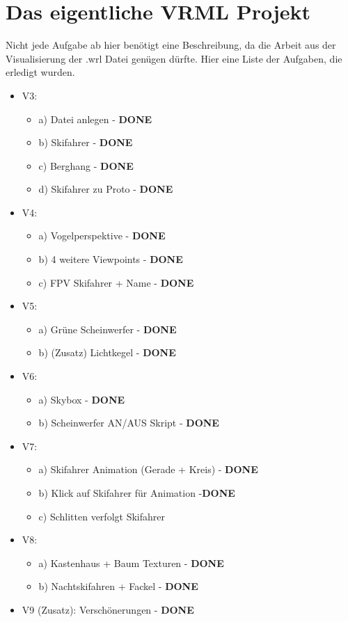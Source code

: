 \documentclass{article}
\begin{document}
\newpage

\section*{Das eigentliche VRML Projekt}
Nicht jede Aufgabe ab hier benötigt eine Beschreibung, da die Arbeit aus der Visualisierung der .wrl
Datei genügen dürfte. Hier eine Liste der Aufgaben, die erledigt wurden.

\begin{itemize}
    \item V3:
    \begin{itemize}
        \item a) Datei anlegen - \textbf{DONE}
        \item b) Skifahrer - \textbf{DONE}
        \item c) Berghang - \textbf{DONE}
        \item d) Skifahrer zu Proto - \textbf{DONE}
    \end{itemize}
    \item V4:
    \begin{itemize}
        \item a) Vogelperspektive - \textbf{DONE}
        \item b) 4 weitere Viewpoints - \textbf{DONE}
        \item c) FPV Skifahrer + Name - \textbf{DONE}
    \end{itemize}
    \item V5:
    \begin{itemize}
        \item a) Grüne Scheinwerfer - \textbf{DONE}
        \item b) (Zusatz) Lichtkegel - \textbf{DONE}
    \end{itemize}
    \item V6:
    \begin{itemize}
        \item a) Skybox - \textbf{DONE}
        \item b) Scheinwerfer AN/AUS Skript - \textbf{DONE}
    \end{itemize}
    \item V7:
    \begin{itemize}
        \item a) Skifahrer Animation (Gerade + Kreis) - \textbf{DONE}
        \item b) Klick auf Skifahrer für Animation -\textbf{DONE}
        \item c) Schlitten verfolgt Skifahrer
    \end{itemize}
    \item V8:
    \begin{itemize}
        \item a) Kastenhaus + Baum Texturen - \textbf{DONE}
        \item b) Nachtskifahren + Fackel - \textbf{DONE}
    \end{itemize}
    \item V9 (Zusatz): Verschönerungen - \textbf{DONE}
\end{itemize}
\end{document}
